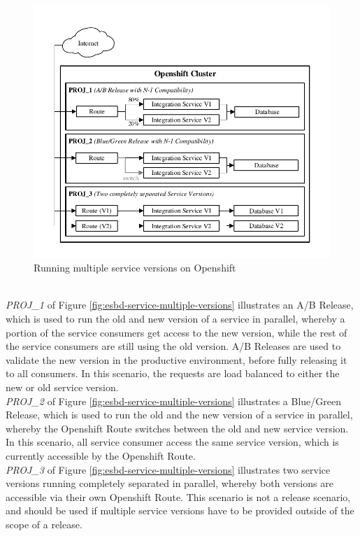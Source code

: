 \begin{figure}[htbp]
	\centering
	\includegraphics[scale=1]{images/esbd-service-multiple-versions.pdf}
	\caption{Running multiple service versions on Openshift}
	\label{fig:esbd-service-multiple-versions}
\end{figure}
\ \\
\emph{PROJ\_1} of Figure \vref{fig:esbd-service-multiple-versions} illustrates an A/B Release, which is used to run the old and new version of a service in parallel, whereby a portion of the service consumers get access to the new version, while the rest of the service consumers are still using the old version. A/B Releases are used to validate the new version in the productive environment, before fully releasing it to all consumers. In this scenario, the requests are load balanced to either the new or old service version. \\ 

\emph{PROJ\_2} of Figure \vref{fig:esbd-service-multiple-versions} illustrates a Blue/Green Release, which is used to run the old and the new version of a service in parallel, whereby the Openshift Route switches between the old and new service version. In this scenario, all service consumer access the same service version, which is currently accessible by the Openshift Route. \\

\emph{PROJ\_3} of Figure \vref{fig:esbd-service-multiple-versions} illustrates two service versions running completely separated in parallel, whereby both versions are accessible via their own Openshift Route. This scenario is not a release scenario, and should be used if multiple service versions have to be provided outside of the scope of a release. \\

